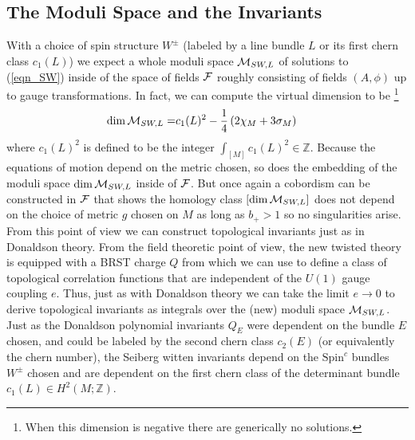 \documentclass[12pt, onecolumn]{article}
\begin{document}
\subsection{The Moduli Space and the Invariants}
With a choice of spin structure $W^{\pm}$ (labeled by a line bundle $L$ or its first chern class $c_{1}(L)$) we expect a whole moduli space ${\cal M}_{SW,L}$ of solutions to (\ref{eqn_SW}) inside of the space of fields ${\cal F}$ roughly consisting of fields $(A,\phi)$ up to gauge transformations.  In fact, we can compute the virtual dimension to be \footnote{When this dimension is negative there are generically no solutions.}
\begin{align*}
\dim {\cal M}_{SW,L}=&c_{1}(L)^2-\frac{1}{4}\left(2\chi_{M}+3\sigma_{M}\right)
\end{align*}
where $c_{1}(L)^2$ is defined to be the integer $\int_{[M]}c_{1}(L)^2 \in \mathbb{Z}$.  Because the equations of motion depend on the metric chosen, so does the embedding of the moduli space $\dim {\cal M}_{SW,L}$ inside of ${\cal F}$.  But once again a cobordism can be constructed in ${\cal F}$ that shows the homology class $[\dim {\cal M}_{SW,L}]$ does not depend on the choice of metric $g$ chosen on $M$ as long as $b_{+}>1$ so no singularities arise.  From this point of view we can construct topological invariants just as in Donaldson theory.  From the field theoretic point of view, the new twisted theory is equipped with a BRST charge $Q$ from which we can use to define a class of topological correlation functions that are independent of the $U(1)$ gauge coupling $e$.  Thus, just as with Donaldson theory we can take the limit $e \rightarrow 0$ to derive topological invariants as integrals over the (new) moduli space ${\cal M}_{SW,L}$.  Just as the Donaldson polynomial invariants $Q_{E}$ were dependent on the bundle $E$ chosen, and could be labeled by the second chern class $c_{2}(E)$ (or equivalently the chern number), the Seiberg witten invariants depend on the $\text{Spin}^{c}$ bundles $W^{\pm}$ chosen and are dependent on the first chern class of the determinant bundle $c_{1}(L) \in H^{2}(M;\mathbb{Z})$.

\vspace{5mm}
\end{document}
